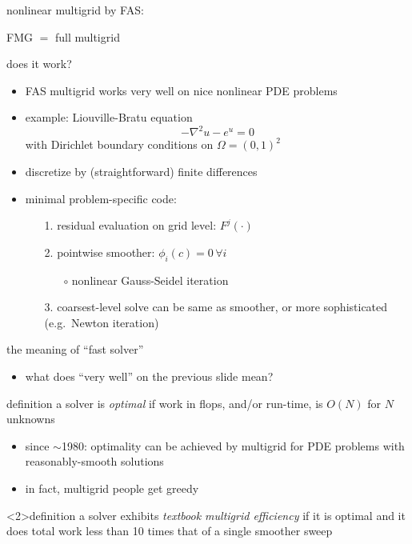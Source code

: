 \documentclass[svgnames,
               hyperref={colorlinks,citecolor=DeepPink4,linkcolor=FireBrick,urlcolor=Maroon},
               usepdftitle=false]  %
               {beamer}
\begin{document}
\begin{frame}{nonlinear multigrid by FAS: }
{\centering


FMG $=$ full multigrid

\vspace{6mm}
}
\end{frame}


\begin{frame}{does it work?}

\begin{itemize}
\item FAS multigrid works \alert{very well} on nice nonlinear PDE problems
\item example: Liouville-Bratu equation
    $$-\nabla^2 u - e^u = 0$$
with Dirichlet boundary conditions on $\Omega=(0,1)^2$
\item discretize by (straightforward) finite differences
\item minimal problem-specific code:
    \begin{enumerate}
    \item[1.] residual evaluation on grid level: $F^j(\cdot)$
    \item[2.] pointwise smoother: $\phi_i(c) = 0 \,\forall i$
        \begin{itemize}
        \item[$\circ$] nonlinear Gauss-Seidel iteration
        \end{itemize}
    \item[3.] coarsest-level solve can be same as smoother, or more sophisticated (e.g.~Newton iteration)
    \end{enumerate}
\end{itemize}
\end{frame}


\begin{frame}{the meaning of ``fast solver''}

\begin{itemize}
\item what does ``very well'' on the previous slide mean?
\end{itemize}

\begin{block}{definition} a solver is \emph{optimal} if work in flops, and/or run-time, is $O(N)$ for $N$ unknowns
\end{block}

\begin{itemize}
\item since $\sim$1980: optimality can be achieved by multigrid for PDE problems with reasonably-smooth solutions
\item<2> in fact, multigrid people get greedy
\end{itemize}

\begin{block}<2>{definition} a solver exhibits \emph{textbook multigrid efficiency} if it is optimal and it does total work less than 10 times that of a single smoother sweep
\end{block}
\end{frame}
\end{document}
